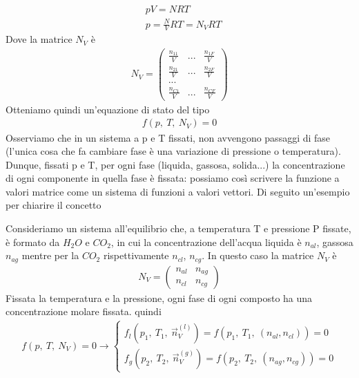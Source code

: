 \documentclass[
10pt, %
a4paper, %
oneside, %
headinclude,footinclude, %
BCOR5mm, %
]{scrartcl}
\begin{document}
\begin{align*}
	&pV = NRT\\
	&p = \frac{N}{V} RT = N_V R T
\end{align*}
Dove la matrice \(N_V\) è
\begin{align*}
	N_V = \begin{pmatrix}
		\frac{n_{11}}{V}&...&\frac{n_{1F}}{V}\\
		\frac{n_{21}}{V}&...&\frac{n_{2F}}{V}\\
		...&&\\
		\frac{n_{C1}}{V}&...&\frac{n_{CF}}{V}
	\end{pmatrix}
\end{align*}
Otteniamo quindi un'equazione di stato del tipo
\begin{align}\label{eq:funz_di_stato_generale}
	f(p,\ T,\ N_V)= 0
\end{align}
Osserviamo che in un sistema a p e T fissati, non avvengono passaggi di fase (l'unica cosa che fa cambiare fase è una variazione di pressione o temperatura). Dunque, fissati p e T, per ogni fase (liquida, gassosa, solida...) la concentrazione di ogni componente in quella fase è fissata: possiamo così scrivere la funzione a valori matrice come un sistema di funzioni a valori vettori. Di seguito un'esempio per chiarire il concetto
\begin{exercise}[Esempio]
	Consideriamo un sistema all'equilibrio che, a temperatura T e pressione P fissate, è formato da \(H_2O\) e \(CO_2\), in cui la concentrazione dell'acqua liquida è \(n_{al}\), gassosa \(n_{ag}\) mentre per la \(CO_2\) rispettivamente \(n_{cl}\), \(n_{cg}\). In questo caso la matrice \(N_V\) è
	\begin{align*}
		N_V = \begin{pmatrix}
			n_{al}& n_{ag}\\
			n_{cl}& n_{cg}
		\end{pmatrix}
	\end{align*}
	Fissata la temperatura e la pressione, ogni fase di ogni composto ha una concentrazione molare fissata. quindi
	\begin{align*}
		f(p,\ T,\ N_V)=0 \rightarrow
		\begin{cases}
			f_{l}(p_1,\ T_1,\ \vec{n}_V^{(l)})=f(p_1,\ T_1,\ (n_{al}, n_{cl}))=0\\
			f_{g}(p_2,\ T_2,\ \vec{n}_V^{(g)})=f(p_2,\ T_2,\ (n_{ag}, n_{cg}))=0
		\end{cases}
	\end{align*}
\end{exercise}
\end{document}
